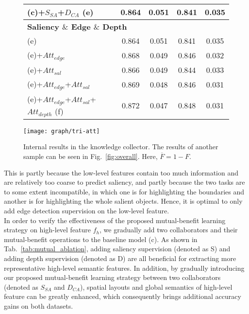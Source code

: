 \documentclass[runningheads]{llncs}
\begin{document}
\begin{wrapfigure}{r}{0.52\textwidth}
\begin{minipage}[t]{0.52\textwidth}
\begin{minipage}[t]{1\textwidth}
{\begin{tabular}{lcccc}
						(c)+$S_{SA}$+$D_{CA}$ (e)	&0.864	&0.051	&0.841	&0.035\\\midrule\midrule
			\multicolumn{5}{l}{\textbf{Saliency $\&$ Edge $\&$ Depth}} \\
						(e)							&0.864	&0.051	&0.841	&0.035\\
						(e)+$Att_{edge}$				&0.868	&0.049	&0.846	&0.032\\
						(e)+$Att_{sal}$					&0.866	&0.049	&0.844	&0.033\\
				(e)+$Att_{edge}$+$Att_{sal}$			       &0.869	&0.048	&0.846	&0.031\\
                    (e)+$Att_{edge}$+$Att_{sal}$+$Att_{depth}$ (f)	 	&0.872	&0.047	&0.848	&0.031\\\bottomrule
	\end{tabular}}
	\label{tab:mutual_ablation}
\end{minipage}
 	 \vfill
	\begin{minipage}[t]{1\linewidth}
\vspace{0.2cm}
  \centerline{\texttt{[image: graph/tri-att]}}
  \vspace{-0.3cm}
  \caption{Internal results in the knowledge collector. The results of another sample can be seen in Fig.~\ref{fig:overall}. Here, $\overline{F} = 1-F$.}
  \label{fig:tri-att}
\end{minipage}
\end{minipage}
\vspace{-0.55cm}
\label{fig:res}
\end{wrapfigure}
This is partly because the low-level features contain too much information and are relatively too coarse to predict saliency, and partly because the two tasks are to some extent incompatible, in which one is for highlighting the boundaries and another is for highlighting the whole salient objects.
Hence, it is optimal to only add edge detection supervision on the low-level feature.
\\
In order to verify the effectiveness of the proposed mutual-benefit learning strategy on high-level feature $f_h$, we gradually add two collaborators and their mutual-benefit operations to the baseline model (c).
As shown in Tab.~\ref{tab:mutual_ablation}, adding saliency supervision (denoted as S) and adding depth supervision (denoted as D) are all beneficial for extracting more representative high-level semantic features.
In addition, by gradually introducing our proposed mutual-benefit learning strategy between two collaborators (denoted as $S_{SA}$ and $D_{CA}$), spatial layouts and global semantics of high-level feature can be greatly enhanced, which consequently brings additional accuracy gains on both datasets.
\end{document}
